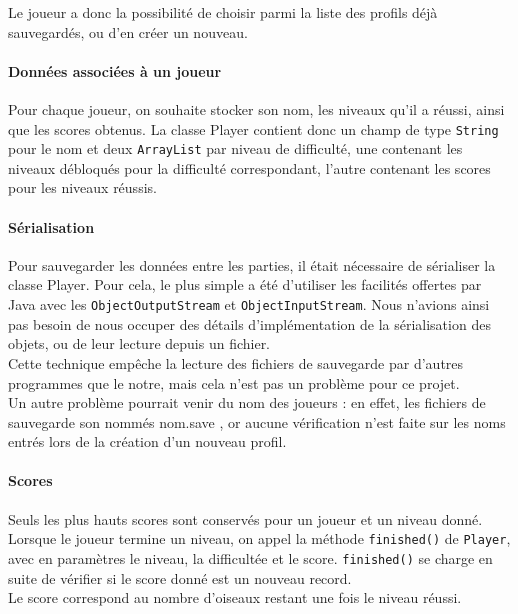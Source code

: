 \documentclass[a4paper,12pt]{report}
\begin{document}
Le joueur a donc la possibilité de choisir parmi la liste des profils déjà sauvegardés, 
ou d'en créer un nouveau.

\paragraph*{Données associées à un joueur}
Pour chaque joueur, on souhaite stocker son nom, les niveaux qu'il a réussi, ainsi 
que les scores obtenus. La classe Player contient donc un champ de type \verb+String+ 
pour le nom et deux \verb+ArrayList+ par niveau de difficulté, une contenant les niveaux 
débloqués pour la difficulté correspondant, l'autre contenant les scores pour les niveaux réussis.

\paragraph*{Sérialisation}
Pour sauvegarder les données entre les parties, il était nécessaire de sérialiser 
la classe Player. Pour cela, le plus simple a été d'utiliser les facilités offertes par 
Java avec les \verb+ObjectOutputStream+ et \verb+ObjectInputStream+. Nous n'avions ainsi pas 
besoin de nous occuper des détails d'implémentation de la sérialisation des objets, ou de leur 
lecture depuis un fichier. \\

Cette technique empêche la lecture des fichiers de sauvegarde par d'autres programmes 
que le notre, mais cela n'est pas un problème pour ce projet. \\

Un autre problème pourrait venir du nom des joueurs : en effet, les fichiers de 
sauvegarde son nommés \guillemotleft nom.save \guillemotright, or aucune vérification 
n'est faite sur les noms entrés lors de la création d'un nouveau profil.

\paragraph*{Scores}
Seuls les plus hauts scores sont conservés pour un joueur et un niveau donné. 
Lorsque le joueur termine un niveau, on appel la méthode \verb+finished()+ de 
\verb+Player+, avec en paramètres le niveau, la difficultée et le score. \verb+finished()+ 
se charge en suite de vérifier si le score donné est un nouveau record. \\

Le score correspond au nombre d'oiseaux restant une fois le niveau réussi.
\end{document}
